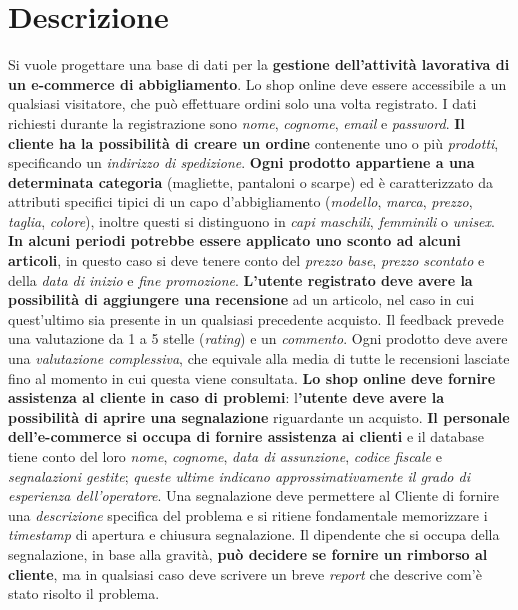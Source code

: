 \section{Descrizione}

Si vuole progettare una base di dati per la\textbf{ gestione dell'attività lavorativa di un e-commerce di abbigliamento}. Lo shop online deve essere accessibile a un qualsiasi visitatore, che può effettuare ordini solo una volta registrato. I dati richiesti durante la registrazione sono \textit{nome}, \textit{cognome}, \textit{email} e \textit{password}. \textbf{Il cliente ha la possibilità di creare un ordine} contenente uno o più \textit{prodotti}, specificando un \textit{indirizzo di spedizione}. \textbf{Ogni prodotto appartiene a una determinata categoria} (magliette, pantaloni o scarpe) ed è caratterizzato da attributi specifici tipici di un capo d'abbigliamento (\textit{modello}, \textit{marca}, \textit{prezzo}, \textit{taglia}, \textit{colore}), inoltre questi si distinguono in\textit{ capi maschili}, \textit{femminili} o \textit{unisex}. \textbf{In alcuni periodi potrebbe essere applicato uno sconto ad alcuni articoli}, in questo caso si deve tenere conto del \textit{prezzo base}, \textit{prezzo scontato} e della\textit{ data di inizio} e \textit{fine promozione}.
\textbf{L'utente registrato deve avere la possibilità di aggiungere una recensione} ad un articolo, nel caso in cui quest'ultimo sia presente in un qualsiasi precedente acquisto. Il feedback prevede una valutazione da 1 a 5 stelle (\textit{rating}) e un \textit{commento}. Ogni prodotto deve avere una \textit{valutazione complessiva}, che equivale alla media di tutte le recensioni lasciate fino al momento in cui questa viene consultata.
\textbf{Lo shop online deve fornire assistenza al cliente in caso di problemi}: l\textbf{'utente deve avere la possibilità di aprire una segnalazione} riguardante un acquisto. \textbf{Il personale dell'e-commerce si occupa di fornire assistenza ai clienti} e il database tiene conto del loro \textit{nome}, \textit{cognome}, \textit{data di assunzione},\textit{ codice fiscale} e \textit{segnalazioni gestite}; \textit{queste ultime indicano approssimativamente il grado di esperienza dell'operatore}. Una segnalazione deve permettere al Cliente di fornire una \textit{descrizione} specifica del problema e si ritiene fondamentale memorizzare i \textit{timestamp} di apertura e chiusura segnalazione. Il dipendente che si occupa della segnalazione, in base alla gravità,\textbf{ può decidere se fornire un rimborso al cliente}, ma in qualsiasi caso deve scrivere un breve \textit{report} che descrive com'è stato risolto il problema.
\newpage